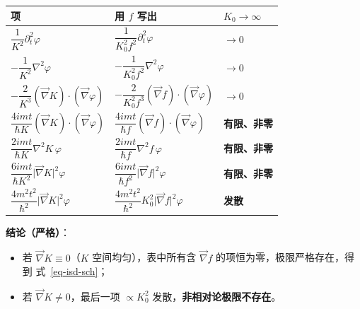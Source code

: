 \documentclass[
  chinese,
  a4paper,
  UTF8,
  12pt,
  oneside,
  openany]{ctexbook}
\newcounter{none} %
\providecommand{\tightlist}{%
  \setlength{\itemsep}{0pt}\setlength{\parskip}{0pt}}
\theoremstyle{plain}
\theoremstyle{plain}
\theoremstyle{plain}
\theoremstyle{definition}
\theoremstyle{plain}
\theoremstyle{plain}
\theoremstyle{remark}
\begin{document}
{\def\LTcaptype{none} %
\begin{longtable}[]{@{}
  >{\raggedright\arraybackslash}p{}
  >{\raggedright\arraybackslash}p{}
  >{\raggedright\arraybackslash}p{}@{}}
\toprule\noalign{}
\begin{minipage}[b]{\linewidth}\raggedright
项
\end{minipage} & \begin{minipage}[b]{\linewidth}\raggedright
用 \(f\) 写出
\end{minipage} & \begin{minipage}[b]{\linewidth}\raggedright
\(K_0\to\infty\)
\end{minipage} \\
\midrule\noalign{}
\endhead
\bottomrule\noalign{}
\endlastfoot
\(\dfrac{1}{K^{2}}\partial_t^{2}\varphi\) &
\(\dfrac{1}{K_0^{2}f^{2}}\partial_t^{2}\varphi\) & \(\to0\) \\
\(-\dfrac{1}{K^{2}}\nabla^{2}\varphi\) &
\(-\dfrac{1}{K_0^{2}f^{2}}\nabla^{2}\varphi\) & \(\to0\) \\
\(-\dfrac{2}{K^{3}}(\vec\nabla K)\!\cdot\!(\vec\nabla\varphi)\) &
\(-\dfrac{2}{K_0^{2}f^{3}}(\vec\nabla f)\!\cdot\!(\vec\nabla\varphi)\) &
\(\to0\) \\
\(\dfrac{4imt}{\hbar K}(\vec\nabla K)\!\cdot\!(\vec\nabla\varphi)\) &
\(\dfrac{4imt}{\hbar f}(\vec\nabla f)\!\cdot\!(\vec\nabla\varphi)\) &
\textbf{有限、非零} \\
\(\dfrac{2imt}{\hbar K}\nabla^{2}K\,\varphi\) &
\(\dfrac{2imt}{\hbar f}\nabla^{2}f\,\varphi\) & \textbf{有限、非零} \\
\(\dfrac{6imt}{\hbar K^{2}}\lvert\vec\nabla K\rvert^{2}\varphi\) &
\(\dfrac{6imt}{\hbar f^{2}}\lvert\vec\nabla f\rvert^{2}\varphi\) &
\textbf{有限、非零} \\
\(\dfrac{4m^{2}t^{2}}{\hbar^{2}}\lvert\vec\nabla K\rvert^{2}\varphi\) &
\(\dfrac{4m^{2}t^{2}}{\hbar^{2}}K_0^{2}\lvert\vec\nabla f\rvert^{2}\varphi\)
& \textbf{发散} \\
\end{longtable}
}

\textbf{结论（严格）}：

\begin{itemize}
\tightlist
\item
  若 \(\vec\nabla K\equiv0\)（\(K\) 空间均匀），表中所有含
  \(\vec\nabla f\) 的项恒为零，极限严格存在，得到 式~\ref{eq-isd-sch}；
\item
  若 \(\vec\nabla K\neq0\)，最后一项 \(\propto K_0^{2}\)
  发散，\textbf{非相对论极限不存在}。
\end{itemize}
\end{document}

